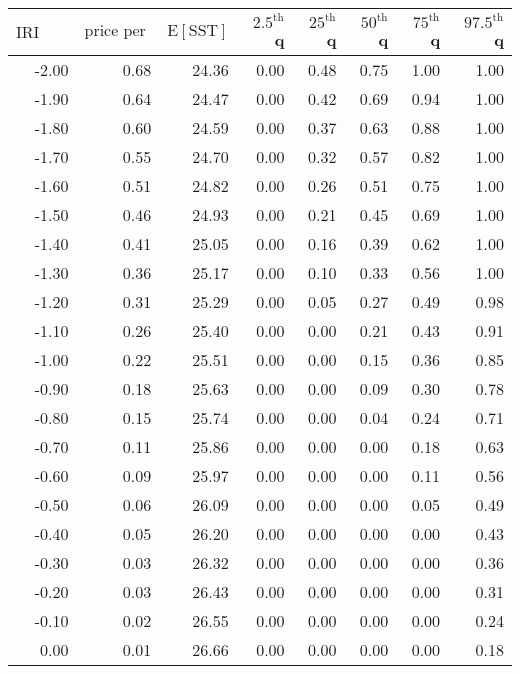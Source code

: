 \begin{table*}[ht]
\centering \footnotesize
\begin{tabular}{rrrrrrrr}
  \hline
$\mbox{IRI anom}$ & $\mbox{price per USD}$ & $\mbox{E}[\mbox{SST}]$ & $2.5^{\mbox{th}}$ q & $25^{\mbox{th}}$ q & $50^{\mbox{th}}$ q & $75^{\mbox{th}}$ q & $97.5^{\mbox{th}}$ q \\ 
  \hline
-2.00 & 0.68 & 24.36 & 0.00 & 0.48 & 0.75 & 1.00 & 1.00 \\ 
  -1.90 & 0.64 & 24.47 & 0.00 & 0.42 & 0.69 & 0.94 & 1.00 \\ 
  -1.80 & 0.60 & 24.59 & 0.00 & 0.37 & 0.63 & 0.88 & 1.00 \\ 
  -1.70 & 0.55 & 24.70 & 0.00 & 0.32 & 0.57 & 0.82 & 1.00 \\ 
  -1.60 & 0.51 & 24.82 & 0.00 & 0.26 & 0.51 & 0.75 & 1.00 \\ 
  -1.50 & 0.46 & 24.93 & 0.00 & 0.21 & 0.45 & 0.69 & 1.00 \\ 
  -1.40 & 0.41 & 25.05 & 0.00 & 0.16 & 0.39 & 0.62 & 1.00 \\ 
  -1.30 & 0.36 & 25.17 & 0.00 & 0.10 & 0.33 & 0.56 & 1.00 \\ 
  -1.20 & 0.31 & 25.29 & 0.00 & 0.05 & 0.27 & 0.49 & 0.98 \\ 
  -1.10 & 0.26 & 25.40 & 0.00 & 0.00 & 0.21 & 0.43 & 0.91 \\ 
  -1.00 & 0.22 & 25.51 & 0.00 & 0.00 & 0.15 & 0.36 & 0.85 \\ 
  -0.90 & 0.18 & 25.63 & 0.00 & 0.00 & 0.09 & 0.30 & 0.78 \\ 
  -0.80 & 0.15 & 25.74 & 0.00 & 0.00 & 0.04 & 0.24 & 0.71 \\ 
  -0.70 & 0.11 & 25.86 & 0.00 & 0.00 & 0.00 & 0.18 & 0.63 \\ 
  -0.60 & 0.09 & 25.97 & 0.00 & 0.00 & 0.00 & 0.11 & 0.56 \\ 
  -0.50 & 0.06 & 26.09 & 0.00 & 0.00 & 0.00 & 0.05 & 0.49 \\ 
  -0.40 & 0.05 & 26.20 & 0.00 & 0.00 & 0.00 & 0.00 & 0.43 \\ 
  -0.30 & 0.03 & 26.32 & 0.00 & 0.00 & 0.00 & 0.00 & 0.36 \\ 
  -0.20 & 0.03 & 26.43 & 0.00 & 0.00 & 0.00 & 0.00 & 0.31 \\ 
  -0.10 & 0.02 & 26.55 & 0.00 & 0.00 & 0.00 & 0.00 & 0.24 \\ 
  0.00 & 0.01 & 26.66 & 0.00 & 0.00 & 0.00 & 0.00 & 0.18 \\ 

\end{tabular}
\end{table*}
